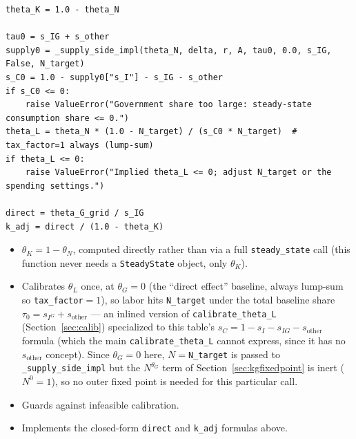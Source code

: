 \documentclass[11pt]{article}
\begin{document}
\begin{lstlisting}[firstnumber=529]
theta_K = 1.0 - theta_N

tau0 = s_IG + s_other
supply0 = _supply_side_impl(theta_N, delta, r, A, tau0, 0.0, s_IG, False, N_target)
s_C0 = 1.0 - supply0["s_I"] - s_IG - s_other
if s_C0 <= 0:
    raise ValueError("Government share too large: steady-state consumption share <= 0.")
theta_L = theta_N * (1.0 - N_target) / (s_C0 * N_target)  # tax_factor=1 always (lump-sum)
if theta_L <= 0:
    raise ValueError("Implied theta_L <= 0; adjust N_target or the spending settings.")

direct = theta_G_grid / s_IG
k_adj = direct / (1.0 - theta_K)
\end{lstlisting}
\begin{itemize}
\item[\textbf{L529}] $\theta_K=1-\theta_N$, computed directly rather than
via a full \texttt{steady\_state} call (this function never needs a
\texttt{SteadyState} object, only $\theta_K$).
\item[\textbf{L532--L534}] Calibrates $\theta_L$ once, at $\theta_G=0$
(the ``direct effect'' baseline, always lump-sum so \texttt{tax\_factor}$=1$),
so labor hits \texttt{N\_target} under the total baseline share
$\tau_0=s_{I^G}+s_{\text{other}}$ --- an inlined version of
\texttt{calibrate\_theta\_L} (Section~\ref{sec:calib}) specialized to
this table's $s_C=1-s_I-s_{IG}-s_{\text{other}}$ formula (which the main
\texttt{calibrate\_theta\_L} cannot express, since it has no
$s_{\text{other}}$ concept). Since $\theta_G=0$ here, $N=$\texttt{N\_target}
is passed to \texttt{\_supply\_side\_impl} but the $N^{\theta_G}$ term of
Section~\ref{sec:kgfixedpoint} is inert ($N^0=1$), so no outer fixed point
is needed for this particular call.
\item[\textbf{L536--L537}] Guards against infeasible calibration.
\item[\textbf{L542--L543}] Implements the closed-form \texttt{direct} and
\texttt{k\_adj} formulas above.
\end{itemize}
\end{document}
